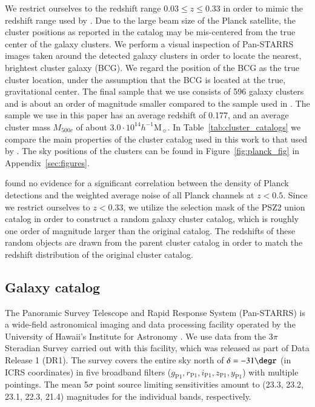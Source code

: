 \documentclass[iop, apjl, twocolappendix, numberedappendix]{emulateapj}
\begin{document}
We restrict ourselves to the redshift range $0.03 \leq z \leq 0.33$
in order to mimic the redshift range used by
\citet{more2016detection}. Due to the large beam size of the Planck
satellite, the cluster positions as reported in the catalog may be
mis-centered from the true center of the galaxy clusters. We perform
a visual inspection of Pan-STARRS images taken around the detected
galaxy clusters in order to locate the nearest, brightest cluster
galaxy (BCG). We regard the position of the BCG as the true cluster
location, under the assumption that the BCG is located at the true,
gravitational center. The final sample that we use consists of 596
galaxy clusters and is about an order of magnitude smaller compared
to the sample used in \citet{more2016detection}. The sample we use
in this paper has an average redshift of 0.177, and an average
cluster mass $M_{500c}$ of about $3.0 \cdot 10^{14}
h^{-1}$M$_{\sun}$. In Table~\ref{tab:cluster_catalogs} we compare
the main properties of the cluster catalog used in this work to that
used by \citet{more2016detection}. The sky positions of the clusters
can be found in Figure~\ref{fig:planck_fig} in
Appendix~\ref{sec:figures}. 

\citet{kosyra2015environment} found no evidence for a significant
correlation between the density of Planck detections and the
weighted average noise of all Planck channels at $z<0.5$. Since we
restrict ourselves to $z<0.33$, we utilize the selection mask of the
PSZ2 union catalog in order to construct a random galaxy cluster
catalog, which is roughly one order of magnitude larger than the
original catalog. The redshifts of these random objects are drawn
from the parent cluster catalog in order to match the redshift
distribution of the original cluster catalog. 

\subsection{Galaxy catalog}
\label{sec:galaxies}
The Panoramic Survey Telescope and Rapid Response System
(Pan-STARRS) is a wide-field astronomical imaging and data
processing facility operated by the University of Hawaii's Institute
for Astronomy \citep{kaiser2002pan,kaiser2010pan}. We use data from
the 3$\pi$ Steradian Survey carried out with this facility, which
was released as part of Data Release 1 (DR1). The survey covers the
entire sky north of $\delta=-31\degr$ (in ICRS coordinates) in five
broadband filters ($g_{\mathrm{P1}}, r_{\mathrm{P1}},
i_{\mathrm{P1}}, z_{\mathrm{P1}}, y_{\mathrm{P1}}$) with multiple
pointings. The mean 5$\sigma$ point source limiting sensitivities
amount to (23.3, 23.2, 23.1, 22.3, 21.4) magnitudes for the
individual bands, respectively. 
\end{document}
